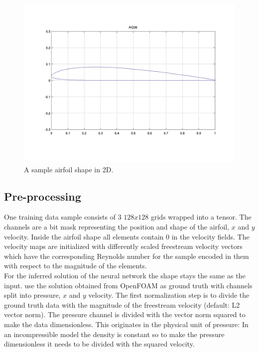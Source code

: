 \documentclass[acmtog]{techreportacmart}
\begin{document}
\begin{figure}[H]
  \includegraphics[width=.4\textwidth]{figures/uiuc_sample}
  \vspace*{-10mm}
  \caption{A sample airfoil shape in 2D.}
  \label{fig:one}
\end{figure}

\subsection{Pre-processing}
One training data sample consists of $3$ $128x128$ grids wrapped into a tensor. The channels are a bit mask representing the position and shape of the airfoil, $x$ and $y$ velocity. Inside the airfoil shape all elements contain $0$ in the velocity fields. The velocity maps are initialized with differently scaled freestream velocity vectors which have the corresponding Reynolds number for the sample encoded in them with respect to the magnitude of the elements. \\For the inferred solution of the neural network the shape stays the same as the input. \cite{Thuerey20} use the solution obtained from OpenFOAM as ground truth with channels split into pressure, $x$ and $y$ velocity. The first normalization step is to divide the  ground truth data with the magnitude of the freestream velocity (default: L2 vector norm). The pressure channel is divided with the vector norm squared to make the data dimensionless. This originates in the physical unit of pressure: In an incompressible model the density is constant so to make the pressure dimensionless it needs to be divided with the squared velocity. \\
\end{document}
